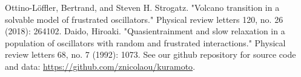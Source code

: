 \documentclass[aps,pre,amsmath,amssymb,floatfix,onecolumn,notitlepage,10pt]{revtex4-1}
\begin{document}
\begin{thebibliography}{99}
Ottino-L\"{o}ffler, Bertrand, and Steven H. Strogatz. "Volcano transition in a solvable model of frustrated oscillators." Physical review letters 120, no. 26 (2018): 264102.
Daido, Hiroaki. "Quasientrainment and slow relaxation in a population of oscillators with random and frustrated interactions." Physical review letters 68, no. 7 (1992): 1073.
See our github repository for source code and data: \url{https://github.com/znicolaou/kuramoto}.
\end{thebibliography}
\end{document}
